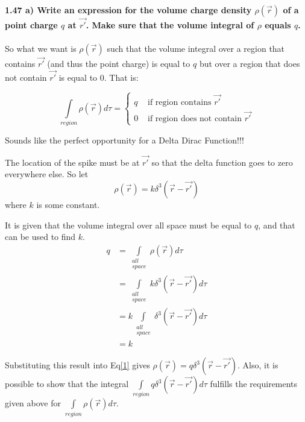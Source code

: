 \documentclass[12pt, oneside]{article}   	%
\begin{document}
\paragraph*{\textbf{1.47 a) Write an expression for the volume charge density $\rho(\vec{r})$ of a point charge $q$ at $\vec{r'}$. Make sure that the volume integral of $\rho$ equals $q$.}}

\paragraph{}So what we want is $\rho(\vec{r})$ such that the volume integral over a region that contains $\vec{r'}$ (and thus the point charge) is equal to $q$ but over a region that does not contain $\vec{r'}$ is equal to 0. That is:

\[ \int\limits_{region}\rho(\vec{r})d\tau=\left\{\begin{array} {ll}
q &\mbox{ if region contains }\vec{r'}\\
0&\mbox{ if region does not contain }\vec{r'}\end{array}\right.\]

Sounds like the perfect opportunity for a Delta Dirac Function!!!

The location of the spike must be at $\vec{r'}$ so that the delta function goes to zero everywhere else. So let 
\begin{equation}\label{1}
\rho(\vec{r})=k\delta^3(\vec{r}-\vec{r'})
\end{equation}
 where $k$ is some constant.

It is given that the volume integral over all space must be equal to $q$, and that can be used to find $k$.
\begin{equation}
\begin{split}
q&=\int\limits_{\substack{all\\space}}\rho(\vec{r})d\tau\\
&=\int\limits_{\substack{all\\space}}k\delta^3(\vec{r}-\vec{r'})d\tau\\
&=k\int\limits_{\substack{all\\space}}\delta^3(\vec{r}-\vec{r'})d\tau\\
&=k
\end{split}
\end{equation}

Substituting this result into Eq\eqref{1} gives
$\boxed{\rho(\vec{r})=q\delta^3(\vec{r}-\vec{r'})}$. Also, it is possible to show that the integral $ \int\limits_{region}q\delta^3(\vec{r}-\vec{r'})d\tau$ fulfills the requirements given above for $\int\limits_{region}\rho(\vec{r})d\tau$.
\end{document}
